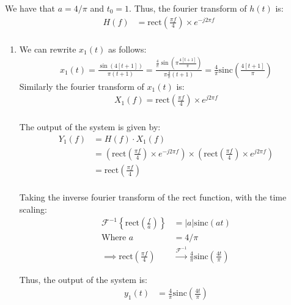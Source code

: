 \documentclass{article}
\begin{document}
We have that $a = 4/\pi$ and $t_0 = 1$. Thus, the fourier transform of $h(t)$ is:
\begin{align*}
    H(f) &= \text{rect}\left(\frac{\pi f}{4}\right) \times e^{-j2\pi f} \\
\end{align*}


\begin{enumerate}[label=2.\arabic*]
    \item We can rewrite $x_1(t)$ as follows:
    \begin{align*}
        x_1(t) = \frac{\sin(4[t+1])}{\pi(t+1)} = \frac{\frac{4}{\pi}\sin\left(\pi \frac{4[t+1]}{\pi}\right)}{\pi \frac{4}{\pi}(t+1)} = \frac{4}{\pi} \text{sinc}\left(\frac{4[t+1]}{\pi}\right)
    \end{align*}
    Similarly the fourier transform of $x_1(t)$ is:
    \begin{align*}
        X_1(f) = \text{rect}\left(\frac{\pi f}{4}\right) \times e^{j2\pi f} \\
    \end{align*}

    The output of the system is given by:
    \begin{align*}
        Y_1(f) &= H(f) \cdot X_1(f) \\
        &= \left(\text{rect}\left(\frac{\pi f}{4}\right) \times e^{-j2\pi f}\right) \times \left( \text{rect}\left(\frac{\pi f}{4}\right) \times e^{j2\pi f}\right) \\
        &= \text{rect}\left(\frac{\pi f}{4}\right)\\
    \end{align*}

    Taking the inverse fourier transform of the rect function, with the time scaling:
    \begin{align*}
        \mathcal{F}^{-1}\left\{\text{rect}\left(\frac{f}{a}\right) \right\} &= |a| \text{sinc}(at) \\
        \text{Where } a &= 4/\pi \\
        \implies \text{rect}\left(\frac{\pi f}{4}\right) &\xrightarrow{\mathcal{F}^{-1}} \frac{4}{\pi} \text{sinc}\left(\frac{4t}{\pi}\right)
    \end{align*}

    Thus, the output of the system is:
    \begin{align*}
        y_1(t) &= \boxed{\frac{4}{\pi}\text{sinc}\left(\frac{4t}{\pi}\right)}
    \end{align*}


\end{enumerate}
\end{document}
